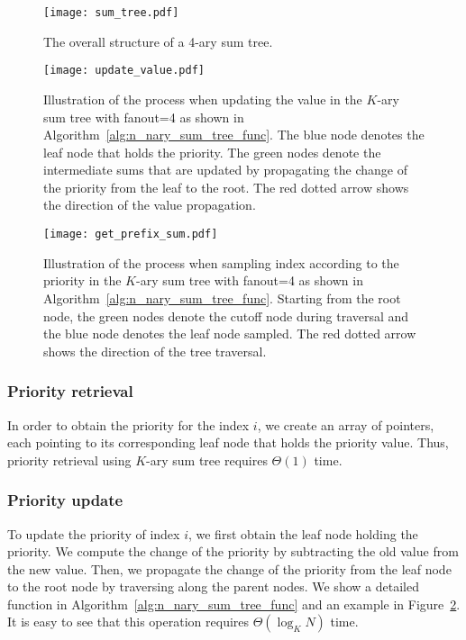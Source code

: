 \begin{figure}
    \centering
    \texttt{[image: sum\_tree.pdf]}
    \caption{The overall structure of a 4-ary sum tree.}
    \label{fig:sum_tree}
\end{figure}

\begin{figure}
    \centering
    \texttt{[image: update\_value.pdf]}
    \caption{Illustration of the process when updating the value in the $K$-ary sum tree with fanout=4 as shown in Algorithm~\ref{alg:n_nary_sum_tree_func}. The blue node denotes the leaf node that holds the priority. The green nodes denote the intermediate sums that are updated by propagating the change of the priority from the leaf to the root. The red dotted arrow shows the direction of the value propagation.}
    \label{fig:update_value}
\end{figure}

\begin{figure*}
    \centering
    \texttt{[image: get\_prefix\_sum.pdf]}
    \caption{Illustration of the process when sampling index according to the priority in the $K$-ary sum tree with fanout=4 as shown in Algorithm~\ref{alg:n_nary_sum_tree_func}. Starting from the root node, the green nodes denote the cutoff node during traversal and the blue node denotes the leaf node sampled. The red dotted arrow shows the direction of the tree traversal.}
    \label{fig:get_prefix_sum}
\end{figure*}

\subsubsection{Priority retrieval}
In order to obtain the priority for the index $i$, we create an array of pointers, each pointing to its corresponding leaf node that holds the priority value. Thus, priority retrieval using $K$-ary sum tree requires $\Theta(1)$ time.

\subsubsection{Priority update}
To update the priority of index $i$, we first obtain the leaf node holding the priority. We compute the change of the priority by subtracting the old value from the new value. Then, we propagate the change of the priority from the leaf node to the root node by traversing along the parent nodes. We show a detailed function in Algorithm~\ref{alg:n_nary_sum_tree_func} and an example in Figure~\ref{fig:update_value}. It is easy to see that this operation requires $\Theta(\log_K N)$ time.

